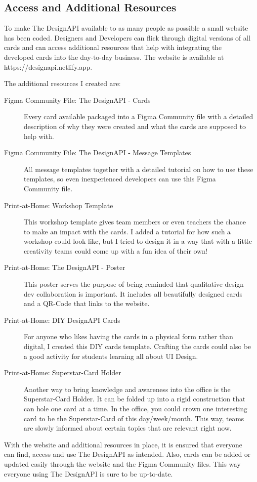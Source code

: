 \newpage
\subsection{Access and Additional Resources}
To make The DesignAPI available to as many people as possible a small website has been coded.
Designers and Developers can flick through digital versions of all cards and can access additional
resources that help with integrating the developed cards into the day-to-day business. The website
is available at https://designapi.netlify.app. 

The additional resources I created are:

\begin{description}
    \item[Figma Community File: The DesignAPI - Cards] Every card available packaged into a Figma
    Community file with a detailed description of why they were created and what the cards are
    supposed to help with.
    \item[Figma Community File: The DesignAPI - Message Templates] All message templates together
    with a detailed tutorial on how to use these templates, so even inexperienced developers can use
    this Figma Community file.
    \item[Print-at-Home: Workshop Template] This workshop template gives team members or even
    teachers the chance to make an impact with the cards. I added a tutorial for how such a workshop
    could look like, but I tried to design it in a way that with a little creativity teams could
    come up with a fun idea of their own!
    \item[Print-at-Home: The DesignAPI - Poster] This poster serves the purpose of being reminded
    that qualitative design-dev collaboration is important. It includes all beautifully designed
    cards and a QR-Code that links to the website.
    \item[Print-at-Home: DIY DesignAPI Cards] For anyone who likes having the cards in a physical
    form rather than digital, I created this DIY cards template. Crafting the cards could also be a
    good activity for students learning all about UI Design.
    \item[Print-at-Home: Superstar-Card Holder] Another way to bring knowledge and awareness into
    the office is the Superstar-Card Holder. It can be folded up into a rigid construction that can
    hole one card at a time. In the office, you could crown one interesting card to be the
    Superstar-Card of this day/week/month. This way, teams are slowly informed about certain topics
    that are relevant right now.
\end{description}

With the website and additional resources in place, it is ensured that everyone can find, access and
use The DesignAPI as intended. Also, cards can be added or updated easily through the website and
the Figma Community files. This way everyone using The DesignAPI is sure to be up-to-date.